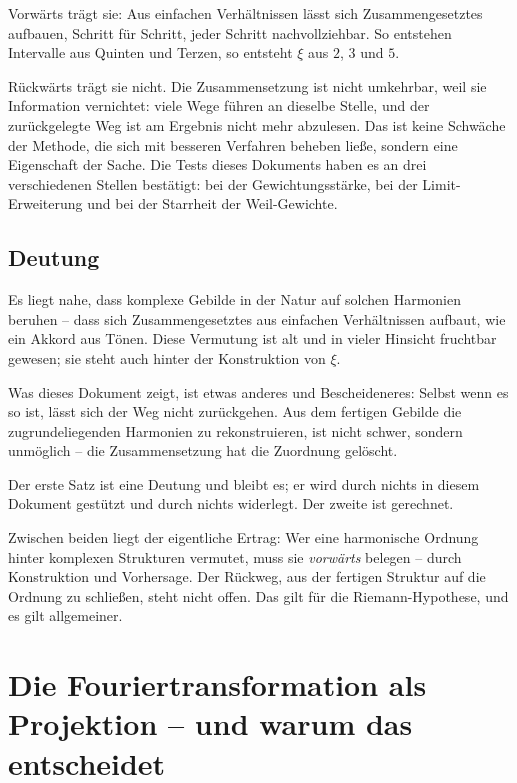 Vorw\"arts tr\"agt sie: Aus einfachen Verh\"altnissen l\"asst sich
Zusammengesetztes aufbauen, Schritt f\"ur Schritt, jeder Schritt
nachvollziehbar. So entstehen Intervalle aus Quinten und Terzen, so
entsteht $\xi$ aus $2$, $3$ und $5$.

R\"uckw\"arts tr\"agt sie nicht. Die Zusammensetzung ist nicht
umkehrbar, weil sie Information vernichtet: viele Wege f\"uhren an
dieselbe Stelle, und der zur\"uckgelegte Weg ist am Ergebnis nicht
mehr abzulesen. Das ist keine Schw\"ache der Methode, die sich mit
besseren Verfahren beheben lie\ss e, sondern eine Eigenschaft der
Sache. Die Tests dieses Dokuments haben es an drei verschiedenen
Stellen best\"atigt: bei der Gewichtungsst\"arke, bei der
Limit-Erweiterung und bei der Starrheit der Weil-Gewichte.

\subsection{Deutung}

\begin{highlight}
Es liegt nahe, dass komplexe Gebilde in der Natur auf solchen
Harmonien beruhen -- dass sich Zusammengesetztes aus einfachen
Verh\"altnissen aufbaut, wie ein Akkord aus T\"onen. Diese Vermutung
ist alt und in vieler Hinsicht fruchtbar gewesen; sie steht auch
hinter der Konstruktion von $\xi$.

Was dieses Dokument zeigt, ist etwas anderes und Bescheideneres: Selbst
wenn es so ist, l\"asst sich der Weg nicht zur\"uckgehen. Aus dem
fertigen Gebilde die zugrundeliegenden Harmonien zu rekonstruieren,
ist nicht schwer, sondern unm\"oglich -- die Zusammensetzung hat die
Zuordnung gel\"oscht.
\end{highlight}

Der erste Satz ist eine Deutung und bleibt es; er wird durch nichts in
diesem Dokument gest\"utzt und durch nichts widerlegt. Der zweite ist
gerechnet.

Zwischen beiden liegt der eigentliche Ertrag: Wer eine harmonische
Ordnung hinter komplexen Strukturen vermutet, muss sie \emph{vorw\"arts}
belegen -- durch Konstruktion und Vorhersage. Der R\"uckweg, aus der
fertigen Struktur auf die Ordnung zu schlie\ss en, steht nicht offen.
Das gilt f\"ur die Riemann-Hypothese, und es gilt allgemeiner.

\section{Die Fouriertransformation als Projektion -- und warum das entscheidet}
\label{sec:projektion}

